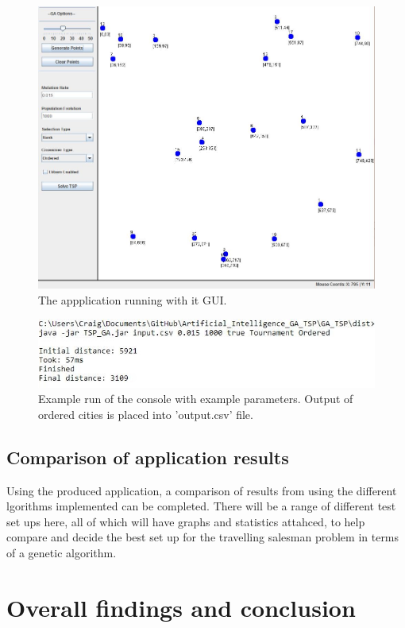 \documentclass[article]{IEEEtran}
\begin{document}
\begin{figure}[H]
\centering
  \includegraphics[width=.8\linewidth]{images/GUI}
  \caption{The appplication running with it GUI.}
  \label{fig:6}
\end{figure}

\begin{figure}[H]
\centering
  \includegraphics[width=.9\linewidth]{images/commandLine}
  \caption{Example run of the console with example parameters. Output of ordered cities is placed into 'output.csv' file.}
  \label{fig:7}
\end{figure}

\subsection{Comparison of application results}
Using the produced application, a comparison of results from using the different lgorithms implemented can be completed. There will be a range of different test set ups here, all of which will have graphs and statistics attahced, to help compare and decide the best set up for the travelling salesman problem in terms of a genetic algorithm.


\section{Overall findings and conclusion}
\end{document}
